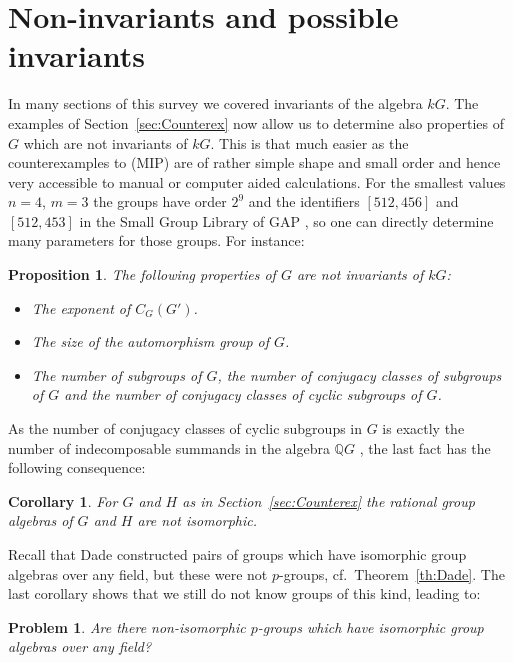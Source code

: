 \documentclass[11pt, a4paper]{amsart}
\newtheorem{corollary}[theorem]{Corollary}
\newtheorem{proposition}[theorem]{Proposition}
\newtheorem{problem}[theorem]{Problem}
\theoremstyle{definition}
\begin{document}
\section{Non-invariants and possible invariants}
In many sections of this survey we covered invariants of the algebra $kG$. The examples of Section~\ref{sec:Counterex} now allow us to determine also properties of $G$ which are not invariants of $kG$. This is that much easier as the counterexamples to (MIP) are of rather simple shape and small order and hence very accessible to manual or computer aided calculations. For the smallest values $n = 4$, $m=3$ the groups have order $2^9$ and the identifiers $[512,456]$ and $[512,453]$ in the Small Group Library \cite{SmallGroupLibrary} of GAP \cite{GAP}, so one can directly determine many parameters for those groups. For instance:

\begin{proposition}\label{prop:NonInvariants}
The following properties of $G$ are not invariants of $kG$:
\begin{itemize}
\item[(i)] The exponent of $C_G(G')$.
\item[(ii)] The size of the automorphism group of $G$.
\item[(iii)] The number of subgroups of $G$, the number of conjugacy classes of subgroups of $G$ and the number of conjugacy classes of cyclic subgroups of $G$.
\end{itemize}
\end{proposition}

As the number of conjugacy classes of cyclic subgroups in $G$ is exactly the number of indecomposable summands in the algebra $\mathbb{Q}G$ \cite[Corollary 7.1.12]{GRG1}, the last fact has the following consequence:

\begin{corollary}
For $G$ and $H$ as in Section~\ref{sec:Counterex} the rational group algebras of $G$ and $H$ are not isomorphic.
\end{corollary}

Recall that Dade constructed pairs of groups which have isomorphic group algebras over any field, but these were not $p$-groups, cf.\ Theorem~\ref{th:Dade}. The last corollary shows that we still do not know groups of this kind, leading to:

\begin{problem}
Are there non-isomorphic $p$-groups which have isomorphic group algebras over any field?
\end{problem}
\end{document}
